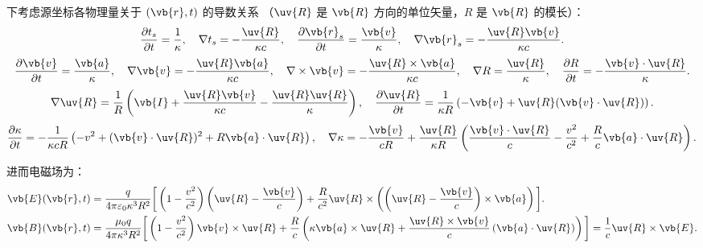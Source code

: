 下考虑源坐标各物理量关于 \((\vb{r}, t)\) 的导数关系 （\(\uv{R}\) 是 \(\vb{R}\) 方向的单位矢量，\(R\) 是 \(\vb{R}\) 的模长）：
\begin{equation*}
	\dfrac{\partial t_s}{\partial t} = \dfrac{1}{\kappa},\quad \nabla t_s = -\dfrac{\uv{R}}{\kappa c},\quad
	\dfrac{\partial \vb{r}_s}{\partial t} = \dfrac{\vb{v}}{\kappa},\quad \nabla \vb{r}_s = -\dfrac{\uv{R} \vb{v}}{\kappa c}.
\end{equation*}
\begin{equation*}
	\dfrac{\partial \vb{v}}{\partial t} = \dfrac{\vb{a}}{\kappa}, \quad \nabla \vb{v} = -\dfrac{\uv{R} \vb{a}}{\kappa c}, \quad \nabla \times \vb{v} = -\dfrac{\uv{R} \times \vb{a}}{\kappa c},\quad
	\nabla R = \dfrac{\uv{R}}{\kappa}, \quad \dfrac{\partial R}{\partial t} = -\dfrac{\vb{v} \cdot \uv{R}}{\kappa}.
\end{equation*}
\begin{equation*}
	\nabla \uv{R} = \dfrac{1}{R} \left( \vb{I} + \dfrac{\uv{R} \vb{v}}{\kappa c} - \dfrac{\uv{R} \uv{R}}{\kappa} \right), \quad \dfrac{\partial \uv{R}}{\partial t} = \dfrac{1}{\kappa R} \left( -\vb{v} + \uv{R} (\vb{v} \cdot \uv{R}) \right).
\end{equation*}
\begin{equation*}
	\dfrac{\partial \kappa}{\partial t} = -\dfrac{1}{\kappa c R} \left( -v^2 + (\vb{v} \cdot \uv{R})^2 + R \vb{a} \cdot \uv{R} \right), \quad \nabla \kappa = -\dfrac{\vb{v}}{c R} + \dfrac{\uv{R}}{\kappa R} \left( \dfrac{\vb{v} \cdot \uv{R}}{c} - \dfrac{v^2}{c^2} + \dfrac{R}{c} \vb{a} \cdot \uv{R} \right).
\end{equation*}

进而电磁场为：
\begin{align*}
	\vb{E}(\vb{r}, t)
	&= \dfrac{q}{4\pi \varepsilon_0 \kappa^3 R^2} \bigg[ \left(1 - \dfrac{v^2}{c^2}\right) \left( \uv{R} - \dfrac{\vb{v}}{c} \right) + \dfrac{R}{c^2} \uv{R} \times \left( \left( \uv{R} - \dfrac{\vb{v}}{c} \right) \times \vb{a} \right) \bigg].\\
	\vb{B}(\vb{r}, t)
	&= \dfrac{\mu_0 q}{4\pi \kappa^3 R^2} \bigg[ \left(1 - \dfrac{v^2}{c^2}\right) \vb{v} \times \uv{R} + \dfrac{R}{c} \left( \kappa \vb{a} \times \uv{R} + \dfrac{\uv{R} \times \vb{v}}{c} \left( \vb{a} \cdot \uv{R} \right) \right) \bigg] = \dfrac{1}{c} \uv{R} \times \vb{E}.
\end{align*}


